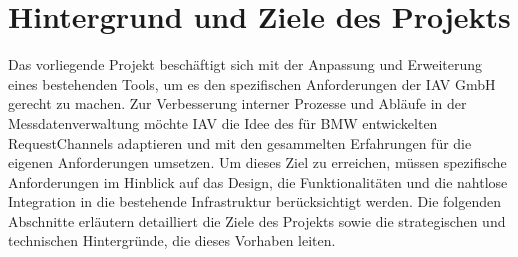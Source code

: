 \chapter{Hintergrund und Ziele des Projekts}
\label{chap:grundlagen}
Das vorliegende Projekt beschäftigt sich mit der Anpassung und Erweiterung eines bestehenden Tools, um es den spezifischen Anforderungen der IAV GmbH gerecht zu machen. Zur Verbesserung interner Prozesse und Abläufe in der Messdatenverwaltung möchte IAV die Idee des für BMW entwickelten RequestChannels adaptieren und mit den gesammelten Erfahrungen für die eigenen Anforderungen umsetzen.
\newline
Um dieses Ziel zu erreichen, müssen spezifische Anforderungen im Hinblick auf das Design, die Funktionalitäten und die nahtlose Integration in die bestehende Infrastruktur berücksichtigt werden. 
\newline
Die folgenden Abschnitte erläutern detailliert die Ziele des Projekts sowie die strategischen und technischen Hintergründe, die dieses Vorhaben leiten.
